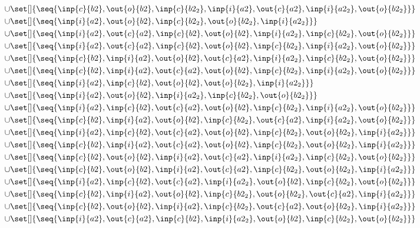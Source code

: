 \begin{align*}
\cup&\set[]{\seq{\inp{c}{b2},\out{o}{b2},\inp{c}{b2_2},\inp{i}{a2},\out{c}{a2},\inp{i}{a2_2},\out{o}{b2_2}}}\\
\cup&\set[]{\seq{\inp{i}{a2},\out{o}{b2},\inp{c}{b2_2},\out{o}{b2_2},\inp{i}{a2_2}}}\\
\cup&\set[]{\seq{\inp{i}{a2},\out{c}{a2},\inp{c}{b2},\out{o}{b2},\inp{i}{a2_2},\inp{c}{b2_2},\out{o}{b2_2}}}\\
\cup&\set[]{\seq{\inp{i}{a2},\out{c}{a2},\inp{c}{b2},\out{o}{b2},\inp{c}{b2_2},\inp{i}{a2_2},\out{o}{b2_2}}}\\
\cup&\set[]{\seq{\inp{c}{b2},\inp{i}{a2},\out{o}{b2},\out{c}{a2},\inp{i}{a2_2},\inp{c}{b2_2},\out{o}{b2_2}}}\\
\cup&\set[]{\seq{\inp{c}{b2},\inp{i}{a2},\out{c}{a2},\out{o}{b2},\inp{c}{b2_2},\inp{i}{a2_2},\out{o}{b2_2}}}\\
\cup&\set[]{\seq{\inp{i}{a2},\inp{c}{b2},\out{o}{b2},\out{o}{b2_2},\inp{i}{a2_2}}}\\
\cup&\set[]{\seq{\inp{i}{a2},\out{o}{b2},\inp{i}{a2_2},\inp{c}{b2_2},\out{o}{b2_2}}}\\
\cup&\set[]{\seq{\inp{i}{a2},\inp{c}{b2},\out{c}{a2},\out{o}{b2},\inp{c}{b2_2},\inp{i}{a2_2},\out{o}{b2_2}}}\\
\cup&\set[]{\seq{\inp{c}{b2},\inp{i}{a2},\out{o}{b2},\inp{c}{b2_2},\out{c}{a2},\inp{i}{a2_2},\out{o}{b2_2}}}\\
\cup&\set[]{\seq{\inp{i}{a2},\inp{c}{b2},\out{c}{a2},\out{o}{b2},\inp{c}{b2_2},\out{o}{b2_2},\inp{i}{a2_2}}}\\
\cup&\set[]{\seq{\inp{c}{b2},\inp{i}{a2},\out{c}{a2},\out{o}{b2},\inp{c}{b2_2},\out{o}{b2_2},\inp{i}{a2_2}}}\\
\cup&\set[]{\seq{\inp{c}{b2},\out{o}{b2},\inp{i}{a2},\out{c}{a2},\inp{i}{a2_2},\inp{c}{b2_2},\out{o}{b2_2}}}\\
\cup&\set[]{\seq{\inp{c}{b2},\out{o}{b2},\inp{i}{a2},\out{c}{a2},\inp{c}{b2_2},\out{o}{b2_2},\inp{i}{a2_2}}}\\
\cup&\set[]{\seq{\inp{i}{a2},\inp{c}{b2},\out{c}{a2},\inp{i}{a2_2},\out{o}{b2},\inp{c}{b2_2},\out{o}{b2_2}}}\\
\cup&\set[]{\seq{\inp{c}{b2},\inp{i}{a2},\out{o}{b2},\inp{c}{b2_2},\out{o}{b2_2},\out{c}{a2},\inp{i}{a2_2}}}\\
\cup&\set[]{\seq{\inp{c}{b2},\out{o}{b2},\inp{i}{a2},\inp{c}{b2_2},\out{c}{a2},\out{o}{b2_2},\inp{i}{a2_2}}}\\
\cup&\set[]{\seq{\inp{i}{a2},\out{c}{a2},\inp{c}{b2},\inp{i}{a2_2},\out{o}{b2},\inp{c}{b2_2},\out{o}{b2_2}}}\\

\end{align*}
